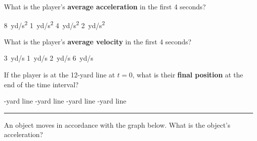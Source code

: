 \documentclass{exam}
\begin{document}
\begin{questions}
\begin{figure}[h!]
    \centering
    \label{fig:my_label}
\end{figure}

\question \label{prob:FootballPlayer1}
What is the player's \textbf{average acceleration} in the first 4 seconds?

\begin{choices}
\choice \SI{8}{yd/s^2}
\correctchoice \SI{1}{yd/s^2}
\choice \SI{4}{yd/s^2}
\choice \SI{2}{yd/s^2}
\end{choices}

\question \label{prob:FootballPlayer2}
What is the player's \textbf{average velocity} in the first 4 seconds?

\begin{choices}
\choice \SI{3}{yd/s}
\choice \SI{1}{yd/s}
\choice \SI{2}{yd/s}
\correctchoice \SI{6}{yd/s}
\end{choices}

\question \label{prob:FootballPlayer3}
If the player is at the 12-yard line at $t=0$, what is their \textbf{final position} at the end of the time interval?

\begin{choices}
-yard line
-yard line
-yard line
-yard line
\end{choices}

\vspace{1em}
\hrule

\clearpage
\question
An object moves in accordance with the graph below. What is the object's acceleration?
\vspace{1em}


\end{questions}
\end{document}
